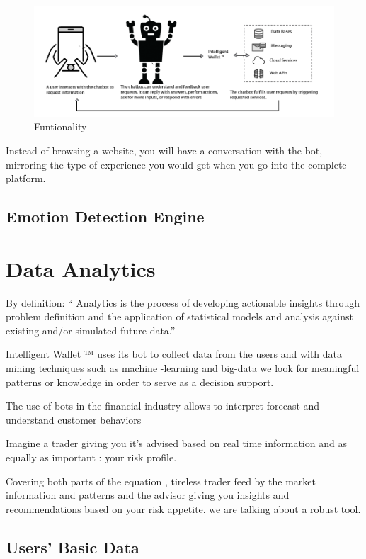 \documentclass[	DIV=calc,%
							paper=letter,%
							fontsize=12pt%
                            ]{scrartcl}	 					%
\begin{document}
\begin{figure}[H]
\centering
\includegraphics[scale=.50]{img/funtionality.png}
\caption{Funtionality}
\label{DiagIntent}
\end{figure}

Instead of browsing a website, you will have a conversation with the bot, mirroring the type of experience you would get when you go into the complete platform.

\subsection{\label{sec:level1}Emotion Detection Engine}



\section{\label{sec:level1}Data Analytics}
By definition: “ Analytics is the process of developing actionable insights through problem definition and the application of statistical models and analysis against existing and/or simulated future data.”

Intelligent Wallet ™  uses its bot to collect data from the users and with data mining techniques such as machine -learning and big-data   we look for meaningful  patterns or knowledge in order to serve as a decision support.

The use of bots in the financial industry allows to interpret forecast and understand customer behaviors 

Imagine a trader giving you it's advised based on real time information and as equally as important : your risk profile.

Covering both parts of the equation , tireless trader feed by the market information and patterns and the advisor giving you insights and recommendations based on your risk appetite. we are talking about a robust tool.

\subsection{\label{sec:level1}Users' Basic Data}
\end{document}
